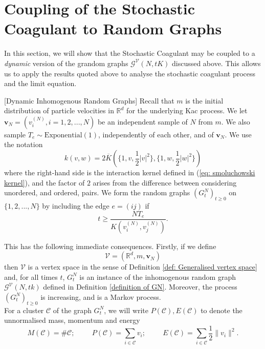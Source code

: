 \section{Coupling of the Stochastic Coagulant to Random Graphs} \label{sec: coupling_to_random_graph}
In this section, we will show that the Stochastic Coagulant may be coupled to a \emph{dynamic} version of the grandom graphs $\mathcal{G}^\mathcal{V}(N,tK)$ discussed above. This allows us to apply the results quoted above to analyse the stochastic coagulant process and the limit equation.
\begin{definition}\label{def: GNT}[Dynamic Inhomogenous Random Graphs] Recall that $m$ is the initial distribution of particle velocities in $\mathbb{R}^d$ for the underlying Kac process. We let $\mathbf{v}_N=(v^{(N)}_i, i=1,2,...,N)$ be an independent sample of $N$ from $m$. We also sample $T_e \sim \text{Exponential}(1)$, independently of each other, and of $\mathbf{v}_N$. We use the notation \begin{equation} k(v,w)=2\overline{K}\left(\{1,v, \frac{1}{2}|v|^2\},\{1,w, \frac{1}{2}|w|^2\}\right) \end{equation} where the right-hand side is the interaction kernel defined in (\ref{eq: smoluchowski kernel}), and the factor of $2$ arises from the difference between considering unordered, and ordered, pairs. We form the random graphs $(G^N_t)_{t \ge 0}$ on $\{1,2,...,N\}$ by including the edge $e=(ij)$ if \begin{equation}
    t\ge \frac{N T_e}{K\left(v^{(N)}_i,v^{(N)}_j\right)}.
\end{equation}  \end{definition} This has the following immediate consequences. Firstly, if we define \begin{equation} \mathcal{V}=(\mathbb{R}^d, m, \mathbf{v}_N)\end{equation} then $\mathcal{V}$ is a vertex space in the sense of Definition \ref{def: Generalised vertex space} and, for all times $t$, $G^N_t$ is an instance of the inhomogenous random graph $\mathcal{G}^{\mathcal{V}}(N, tk)$ defined in Definition \ref{definition of GN}. Moreover, the process $(G^N_t)_{t\ge 0}$ is increasing, and is a Markov process. \medskip \\ For a cluster $\mathcal{C}$ of the graph $G^N_t$, we will write $P(\mathcal{C}), E(\mathcal{C})$ to denote the unnormalised mass, momentum and energy \begin{equation}
   M(\mathcal{C})=\#\mathcal{C}; \hspace{1cm} P(\mathcal{C})=\sum_{i\in \mathcal{C}} v_i;\hspace{1cm} E(\mathcal{C})=\sum_{i\in \mathcal{C}} \frac{1}{2}\|v_i\|^2.

\end{equation}
